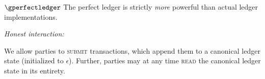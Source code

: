 \begin{functionalitysketch}{$\gperfectledger$}
    The perfect ledger is strictly \emph{more} powerful than actual ledger
    implementations.%

    \vspace{1em}
    \noindent\emph{Honest interaction:}

    We allow parties to \textsc{submit} transactions, which append them to a
    canonical ledger state (initialized to $\epsilon$). Further, parties may at
    any time \textsc{read} the canonical ledger state in its entirety.
\end{functionalitysketch}

